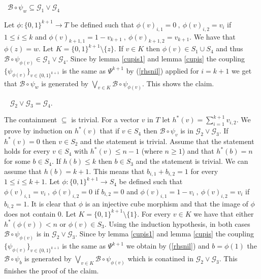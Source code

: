 \documentclass [11pt] {article}
\begin{document}
\medskip

~$\mathcal{B}\circ\psi_w\subseteq \mathcal{G}_1\vee\mathcal{G}_4$

\medskip

Let $\phi:\{0,1\}^{k+1}\rightarrow T$ be defined such that $\phi(v)_{i,1}=0~,~\phi(v)_{i,2}=v_i$ if $1\leq i\leq k$ and $\phi(v)_{k+1,1}=1-v_{k+1}~,~\phi(v)_{k+1,2}=v_{k+1}$. We have that $\phi(z)=w$. Let $K=\{0,1\}^{k+1}\setminus\{z\}$. If $v\in K$ then $\phi(v)\in S_1\cup S_4$ and thus $\mathcal{B}\circ\psi_{\phi(v)}\in\mathcal{G}_1\vee\mathcal{G}_4$.
Since by lemma \ref{cupis1} and lemma \ref{cupis} the coupling $\{\psi_{\phi(v)}\}_{v\in\{0,1\}^{k+1}}$ is the same as $\Psi^{k+1}$ by (\ref{rhsnil}) applied for $i=k+1$ we get that $\mathcal{B}\circ\psi_w$ is generated by $\bigvee_{v\in K}\mathcal{B}\circ\psi_{\phi(v)}$. This shows the claim. 

\medskip

~ $\mathcal{G}_2\vee\mathcal{G}_3=\mathcal{G}_4$.

\medskip

The containment $\subseteq$ is trivial. For a vector $v$ in $T$ let $h^*(v)=\sum_{i=1}^{k+1}v_{i,2}$.
We prove by induction on $h^*(v)$ that if $v\in S_4$ then $\mathcal{B}\circ\psi_v$ is in $\mathcal{G}_2\vee\mathcal{G}_3$. If $h^*(v)=0$ then $v\in S_2$ and the statement is trivial.
Assume that the statement holds for every $v\in S_4$ with $h^*(v)\leq n-1$ (where $n\geq 1$)  and that $h^*(b)=n$ for some $b\in S_4$.
If $h(b)\leq k$ then $b\in S_3$ and the statement is trivial. We can assume that $h(b)=k+1$.
This means that $b_{i,1}+b_{i,2}=1$ for every $1\leq i\leq k+1$. Let $\phi:\{0,1\}^{k+1}\rightarrow S_4$ be defined such that $\phi(v)_{i,1}=v_i~,~\phi(v)_{i,2}=0$ if $b_{i,2}=0$ and $\phi(v)_{i,1}=1-v_i~,~\phi(v)_{i,2}=v_i$ if $b_{i,2}=1$. It is clear that $\phi$ is an injective cube morphism and that the image of $\phi$ does not contain $0$. Let $K=\{0,1\}^{k+1}\setminus\{1\}$. For every $v\in K$ we have that either $h^*(\phi(v))<n$ or $\phi(v)\in S_3$. Using the induction hypothesis, in both cases $\mathcal{B}\circ\psi_{\phi(v)}$ is in $\mathcal{G}_2\vee\mathcal{G}_3$. Since by lemma \ref{cupis1} and lemma \ref{cupis} the coupling $\{\psi_{\phi(v)}\}_{v\in\{0,1\}^{k+1}}$ is the same as $\Psi^{k+1}$ we obtain by (\ref{rhsnil}) and $b=\phi(1)$ the $\mathcal{B}\circ\psi_b$ is generated by $\bigvee_{ v\in K}\mathcal{B}\circ\psi_{\phi(v)}$ which is conatined in $\mathcal{G}_2\vee\mathcal{G}_3$. This finishes the proof of the claim.
\end{document}
